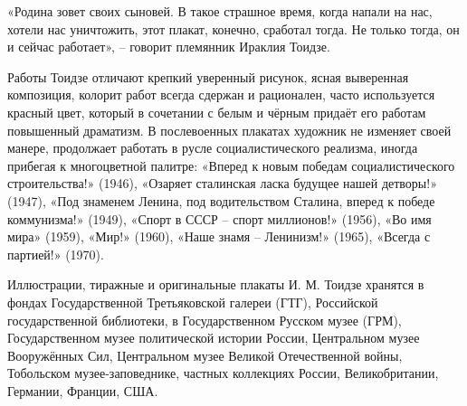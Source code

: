 «Родина зовет своих сыновей. В такое страшное время, когда напали на нас,
хотели нас уничтожить, этот плакат, конечно, сработал тогда. Не только тогда,
он и сейчас работает», – говорит племянник Ираклия Тоидзе.

Работы Тоидзе отличают крепкий уверенный рисунок, ясная выверенная композиция,
колорит работ всегда сдержан и рационален, часто используется красный цвет,
который в сочетании с белым и чёрным придаёт его работам повышенный драматизм.
В послевоенных плакатах художник не изменяет своей манере, продолжает работать
в русле социалистического реализма, иногда прибегая к многоцветной палитре:
«Вперед к новым победам социалистического строительства!» (1946), «Озаряет
сталинская ласка будущее нашей детворы!» (1947), «Под знаменем Ленина, под
водительством Сталина, вперед к победе коммунизма!» (1949), «Спорт в СССР –
спорт миллионов!» (1956), «Во имя мира» (1959), «Мир!» (1960), «Наше знамя –
Ленинизм!» (1965), «Всегда с партией!» (1970).

Иллюстрации, тиражные и оригинальные плакаты И. М. Тоидзе хранятся в фондах
Государственной Третьяковской галереи (ГТГ), Российской государственной
библиотеки, в Государственном Русском музее (ГРМ), Государственном музее
политической истории России, Центральном музее Вооружённых Сил, Центральном
музее Великой Отечественной войны, Тобольском музее-заповеднике, частных
коллекциях России, Великобритании, Германии, Франции, США.
